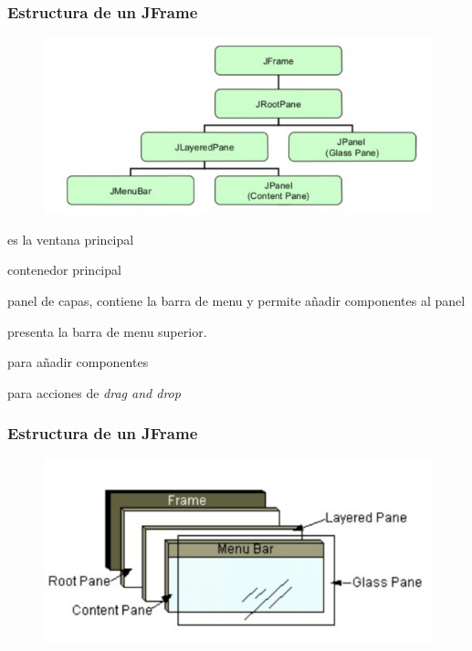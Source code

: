 \documentclass{beamer}
\begin{document}
\begin{frame}
\frametitle{Estructura de un JFrame}
\begin{figure}
\includegraphics[scale=0.4]{imagenes/arq_swing.png}
\end{figure}
\begin{description}[<+->]
\item[JFrame] es la ventana principal
\item[JRootPane] contenedor principal
\item[JLayaredPane] panel de capas, contiene la barra de menu y permite añadir componentes al panel
\item[JMenuBar] presenta la barra de menu superior.
\item[Conte Pane] para añadir componentes
\item[Panel transparente] para acciones de \emph{drag and drop}
\end{description}
\end{frame}

\begin{frame}
\frametitle{Estructura de un JFrame}
\begin{figure}
\includegraphics[scale=0.6]{imagenes/arq1_swing.png}
\end{figure}
\end{frame}
\end{document}

